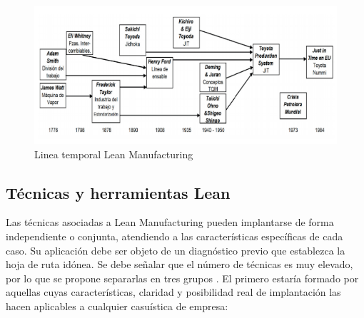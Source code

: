 \begin{figure}
\centering
\includegraphics[scale=0.8]{images/historialean.png}
\caption{Linea temporal Lean Manufacturing \citep{socconini2019}}
\end{figure}

\subsection{Técnicas y herramientas Lean}

Las técnicas asociadas a Lean Manufacturing pueden implantarse de forma independiente o conjunta, atendiendo a las características específicas de cada caso. Su aplicación debe ser objeto de un diagnóstico previo que establezca la hoja de ruta idónea. Se debe señalar que el número de técnicas es muy elevado, por lo que se propone separarlas en tres grupos \citep{leansis2017}. 
El primero estaría formado por aquellas cuyas características, claridad y posibilidad real de implantación las hacen aplicables a cualquier casuística de empresa:

